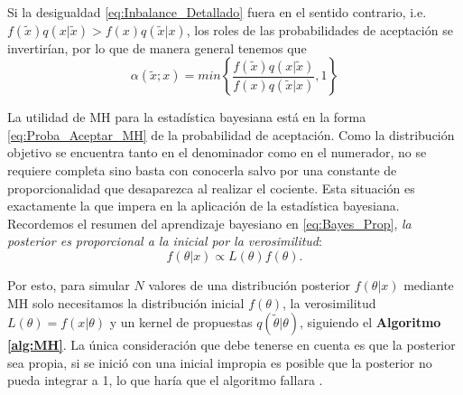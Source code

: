 Si la desigualdad \eqref{eq:Inbalance_Detallado} fuera en el sentido contrario, i.e. $f(\tilde{x})q(x|\tilde{x})>f(x)q(\tilde{x}|x)$, los roles de las probabilidades de aceptación se invertirían, por lo que de manera general tenemos que 
\begin{equation}
\label{eq:Proba_Aceptar_MH}
\alpha(\tilde{x};x)=min\left\lbrace\dfrac{f(\tilde{x})q(x|\tilde{x})}{f(x)q(\tilde{x}|x)},1\right\rbrace
\end{equation}

La utilidad de MH para la estadística bayesiana está en la forma \eqref{eq:Proba_Aceptar_MH} de la probabilidad de aceptación. Como la distribución objetivo se encuentra tanto en el denominador como en el numerador, no se requiere completa sino basta con conocerla salvo por una constante de proporcionalidad que desaparezca al realizar el cociente. Esta situación es exactamente la que impera en la aplicación de la estadística bayesiana. Recordemos el resumen del aprendizaje bayesiano en \eqref{eq:Bayes_Prop}, \textit{la posterior es proporcional a la inicial por la verosimilitud}: 
\begin{equation*}
f(\theta|x) \propto L(\theta)f(\theta).
\end{equation*}

Por esto, para simular $N$ valores de una distribución posterior $f(\theta|x)$ mediante MH solo necesitamos la distribución inicial $f(\theta)$, la verosimilitud $L(\theta)=f(x|\theta)$ y un kernel de propuestas $q(\tilde{\theta}|\theta)$, siguiendo el \textbf{Algoritmo \ref{alg:MH}}. La única consideración que debe tenerse en cuenta es que la posterior sea propia, si se inició con una inicial impropia es posible que la posterior no pueda integrar a 1, lo que haría que el algoritmo fallara \parencite{RobertCasella10}.\\


